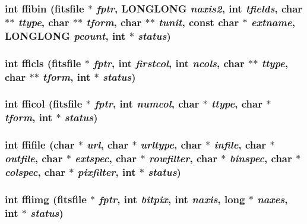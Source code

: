\subsubsection{\setlength{\rightskip}{0pt plus 5cm}int ffibin (\bf{fitsfile} $\ast$ {\em fptr}, \bf{LONGLONG} {\em naxis2}, int {\em tfields}, char $\ast$$\ast$ {\em ttype}, char $\ast$$\ast$ {\em tform}, char $\ast$$\ast$ {\em tunit}, const char $\ast$ {\em extname}, \bf{LONGLONG} {\em pcount}, int $\ast$ {\em status})}\label{fitsio_8h_a58067cf409aa0fa133a4794c43264a3}


\subsubsection{\setlength{\rightskip}{0pt plus 5cm}int fficls (\bf{fitsfile} $\ast$ {\em fptr}, int {\em firstcol}, int {\em ncols}, char $\ast$$\ast$ {\em ttype}, char $\ast$$\ast$ {\em tform}, int $\ast$ {\em status})}\label{fitsio_8h_cd1a0072dd0c525e2263eb781403f1eb}


\subsubsection{\setlength{\rightskip}{0pt plus 5cm}int fficol (\bf{fitsfile} $\ast$ {\em fptr}, int {\em numcol}, char $\ast$ {\em ttype}, char $\ast$ {\em tform}, int $\ast$ {\em status})}\label{fitsio_8h_bbf8d6634ce0e3a4c6446730f4fae58a}


\subsubsection{\setlength{\rightskip}{0pt plus 5cm}int ffifile (char $\ast$ {\em url}, char $\ast$ {\em urltype}, char $\ast$ {\em infile}, char $\ast$ {\em outfile}, char $\ast$ {\em extspec}, char $\ast$ {\em rowfilter}, char $\ast$ {\em binspec}, char $\ast$ {\em colspec}, char $\ast$ {\em pixfilter}, int $\ast$ {\em status})}\label{fitsio_8h_a145a043753a554e3f743ee431fc65d6}


\subsubsection{\setlength{\rightskip}{0pt plus 5cm}int ffiimg (\bf{fitsfile} $\ast$ {\em fptr}, int {\em bitpix}, int {\em naxis}, long $\ast$ {\em naxes}, int $\ast$ {\em status})}\label{fitsio_8h_bdfe7ce055dc6e2df14de16381703b35}


